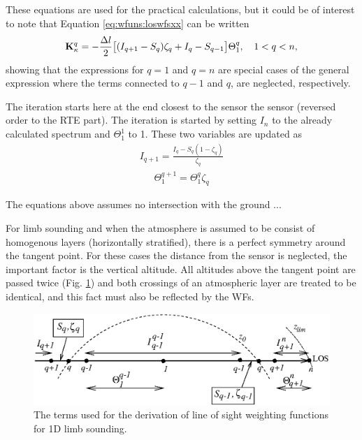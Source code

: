  These equations are used for the practical calculations, but it could
 be of interest to note that Equation \ref{eq:wfuns:loswfsxx} can be
 written
 \begin{equation}
   \mathbf{K}_{\kappa}^q = -\frac{\Delta l}{2} \big[ (I_{q+1}-S_q)\zeta_q+
           I_q-S_{q-1} \big] \Theta^q_1, \quad 1<q<n ,
 \end{equation}
 showing that the expressions for $q=1$ and $q=n$ are special cases of
 the general expression where the terms connected to $q-1$ and $q$,
 are neglected, respectively.
 
 The iteration starts here at the end closest to the sensor the
 sensor (reversed order to the RTE part).  The iteration is
 started by setting $I_n$ to the already calculated spectrum and
 $\Theta^1_1$ to 1.  These two variables are updated as
 \begin{eqnarray}
   I_{q+1} = \frac{I_q - S_q(1-\zeta_q)}{\zeta_q} \nonumber
 \end{eqnarray}
 \begin{eqnarray}
   \Theta_1^{q+1} =  \Theta_1^q \zeta_q \nonumber
 \end{eqnarray}
 
 The equations above assumes no intersection with the ground ...


 
 \label{sec:wfuns:limb}
    
 For limb sounding and when the atmosphere is assumed to be consist of
 homogenous layers (horizontally stratified), there is a perfect
 symmetry around the tangent point. For these cases the distance from
 the sensor is neglected, the important factor is the vertical altitude.
 All altitudes above the tangent point are passed twice (Fig. 
 \ref{fig:wfuns:limb}) and both crossings of an atmospheric layer are
 treated to be identical, and this fact must also be reflected by the
 WFs.

 \begin{figure}[t]
  \begin{center}
   \includegraphics*[width=0.95\hsize]{Figs/wf2.eps}
   \caption{The terms used for the derivation of line of sight weighting
            functions for 1D limb sounding.}
   \label{fig:wfuns:limb}  
  \end{center}
 \end{figure}
 
